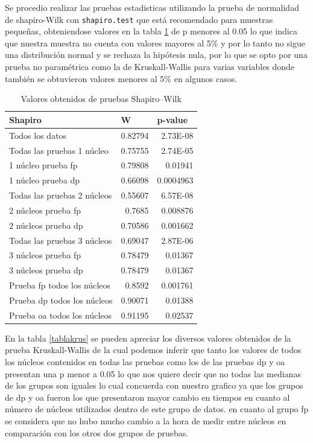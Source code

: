 \documentclass{article}
\begin{document}
Se procedio realizar las pruebas estadisticas utilizando la prueba de normalidad de shapiro-Wilk \cite{shapiro} con \texttt{shapiro.test} que está recomendado para muestras pequeñas, obteniendose valores en la tabla \ref{tablaSha} de p menores al 0.05 lo que indica que nuestra muestra no cuenta con valores mayores al 5\% y por lo tanto no sigue una distribución normal y se rechaza la hipótesis nula, por lo que se opto por una prueba no paramétrica como la de Kruskall-Wallis\cite{Kruskall} para varias variables donde también se obtuvieron valores menores al 5\% en algunos casos.

\begin{table}[h!]
\centering
\caption{Valores obtenidos de pruebas Shapiro–Wilk}
\label{tablaSha}
\begin{tabular}{|l|r|r|}
\hline
\textbf{Shapiro} & \multicolumn{1}{l|}{W} & \multicolumn{1}{l|}{p-value} \\ \hline
Todos los datos & 0.82794 & 2.73E-08 \\ \hline
Todas las pruebas 1 núcleo & 0.75755 & 2.74E-05 \\ \hline
1 núcleo prueba fp & 0.79808 & 0.01941 \\ \hline
1 núcleo prueba dp & 0.66098 & 0.0004963 \\ \hline
Todas las pruebas 2 núcleos & 0.55607 & 6.57E-08 \\ \hline
2 núcleos prueba fp & 0.7685 & 0.008876 \\ \hline
2 núcleos prueba dp & 0.70586 & 0.001662 \\ \hline
Todas las pruebas 3 núcleos & 0.69047 & 2.87E-06 \\ \hline
3 núcleos prueba fp & 0.78479 & 0.01367 \\ \hline
3 núcleos prueba dp & 0.78479 & 0.01367 \\ \hline
Prueba fp todos los núcleos & 0.8592 & 0.001761 \\ \hline
Prueba dp todos los núcleos & 0.90071 & 0.01388 \\ \hline
Prueba oa todos los núcleos & 0.91195 & 0.02537 \\ \hline
\end{tabular}
\end{table}
En la tabla \ref{tablakrus} se pueden apreciar los diversos valores obtenidos de la prueba Kruskall-Wallis de la cual podemos inferir que tanto los valores de todos los núcleos contenidos en todas las pruebas como los de las pruebas dp y oa presentan una p menor a 0.05 lo que nos quiere decir que no todas las medianas de los grupos son iguales lo cual concuerda con nuestro grafico ya que los grupos de dp y oa fueron los que presentaron mayor cambio en tiempos en cuanto al número de núcleos utilizados dentro de este grupo de datos. en cuanto al grupo fp se considera que no hubo mucho cambio a la hora de medir entre núcleos en comparación con los otros dos grupos de pruebas.
\end{document}
